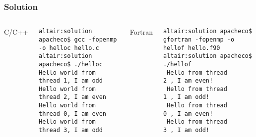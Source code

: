 \documentclass[c,mathserif,compress,xcolor=svgnames]{beamer}
\newenvironment{bblock}[0]
{
\begin{beamerboxesrounded}[upper=uppercol1,lower=lowercol1,shadow=true]}
{\end{beamerboxesrounded}}
\newenvironment{eblock}[0]
{
\begin{beamerboxesrounded}[upper=uppercol2,lower=lowercol2,shadow=true]}
{\end{beamerboxesrounded}}
\begin{document}
\begin{frame}[fragile]
  \frametitle{\small Solution}
  \begin{columns}
    \begin{eblock}{C/C++}
      
    \end{eblock}
    \begin{bblock}{}
      {\fontsize{4}{5}\selectfont
        \begin{Verbatim}
altair:solution apacheco$ gcc -fopenmp -o helloc hello.c
altair:solution apacheco$ ./helloc
Hello world from thread 1, I am odd
Hello world from thread 2, I am even
Hello world from thread 0, I am even
Hello world from thread 3, I am odd
        \end{Verbatim}
      }
    \end{bblock}
    \begin{eblock}{Fortran}
      
    \end{eblock}
    \begin{bblock}{}
      {\fontsize{4}{5}\selectfont
        \begin{Verbatim}
altair:solution apacheco$ gfortran -fopenmp -o hellof hello.f90
altair:solution apacheco$ ./hellof
 Hello from thread           2 , I am even!
 Hello from thread           1 , I am odd!
 Hello from thread           0 , I am even!
 Hello from thread           3 , I am odd!
        \end{Verbatim}
      }
    \end{bblock}
  \end{columns}
\end{frame}
\end{document}
